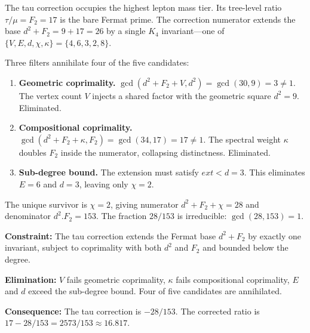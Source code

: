 \documentclass[11pt,a4paper]{book}
\def\cdot{.}%
\def\mathrm#1{#1}%
\begin{document}
The tau correction occupies the highest lepton mass tier.  Its
tree-level ratio $\tau/\mu = F_2 = 17$ is the bare Fermat prime.
The correction numerator extends the base $d^2 + F_2 = 9 + 17 = 26$
by a single $K_4$ invariant---one of
$\{V, E, d, \chi, \kappa\} = \{4, 6, 3, 2, 8\}$.

Three filters annihilate four of the five candidates:

\begin{enumerate}
\item \textbf{Geometric coprimality.}
      $\gcd(d^2 + F_2 + V, d^2) = \gcd(30, 9) = 3 \neq 1$.
      The vertex count $V$ injects a shared factor with the geometric
      square $d^2 = 9$.  Eliminated.

\item \textbf{Compositional coprimality.}
      $\gcd(d^2 + F_2 + \kappa, F_2) = \gcd(34, 17) = 17 \neq 1$.
      The spectral weight $\kappa$ doubles $F_2$ inside the numerator,
      collapsing distinctness.  Eliminated.

\item \textbf{Sub-degree bound.}
      The extension must satisfy $\mathrm{ext} < d = 3$.
      This eliminates $E = 6$ and $d = 3$, leaving only $\chi = 2$.
\end{enumerate}

The unique survivor is $\chi = 2$, giving numerator
$d^2 + F_2 + \chi = 28$ and denominator $d^2 \cdot F_2 = 153$.
The fraction $28/153$ is irreducible: $\gcd(28, 153) = 1$.

\textbf{Constraint:}
The tau correction extends the Fermat base $d^2 + F_2$ by exactly
one invariant, subject to coprimality with both $d^2$ and $F_2$
and bounded below the degree.

\textbf{Elimination:}
$V$ fails geometric coprimality, $\kappa$ fails compositional
coprimality, $E$ and $d$ exceed the sub-degree bound.  Four of
five candidates are annihilated.

\textbf{Consequence:}
The tau correction is $-28/153$.  The corrected ratio is
$17 - 28/153 = 2573/153 \approx 16.817$.
\end{document}
